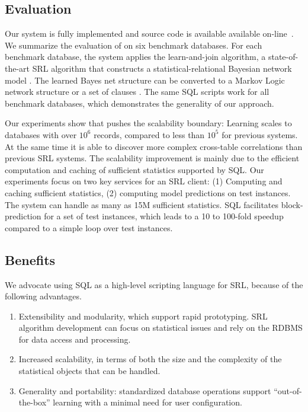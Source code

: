 \documentclass[letterpaper]{article}
\begin{document}
\subsection{Evaluation} Our system is fully implemented and source code is available available on-line~\cite{bib:bbsite}. We summarize the evaluation of \FB on six benchmark databases. For each benchmark database, the system applies the learn-and-join algorithm, a state-of-the-art SRL algorithm that constructs a  statistical-relational Bayesian network model \cite{Schulte2012}. The learned Bayes net structure can be converted to a Markov Logic network structure or a set of clauses \cite{Khosravi2010}.
The same SQL scripts work for all benchmark databases, which demonstrates the generality of our approach.  

Our experiments show that \FB pushes the scalability boundary: Learning scales to databases with over $10^6$ records, compared to less than $10^5$ for previous systems. At the same time it is able to discover more complex cross-table correlations than previous SRL systems. The scalability improvement is mainly due to the efficient computation and caching of sufficient statistics supported by SQL. Our experiments focus on two key services  for an SRL client: (1) Computing and caching sufficient statistics, (2) computing model predictions on test instances. The system can handle as many as 15M sufficient statistics. 
SQL facilitates block-prediction for a set of test instances, which leads to a 10 to 100-fold speedup compared to a simple loop over test instances.

\subsection{Benefits}
We advocate using SQL as a high-level scripting language for SRL, because of the following advantages.

\begin{enumerate}
\item Extensibility and modularity, which support rapid prototyping. SRL algorithm development can focus on statistical issues and rely on the RDBMS for data access and processing.
\item Increased scalability, in terms of both the size and the complexity of the statistical objects that can be handled.
\item Generality and portability: standardized database operations support ``out-of-the-box'' learning with a minimal need for user configuration.
\end{enumerate}
\end{document}
